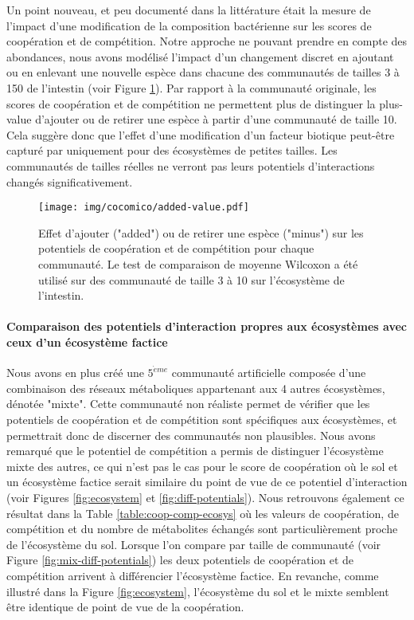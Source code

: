 \documentclass[../main.tex]{subfiles}
\begin{document}
Un point nouveau, et peu documenté dans la littérature était la mesure de l'impact d'une modification de la composition bactérienne sur les scores de coopération et de compétition. Notre approche ne pouvant prendre en compte des abondances, nous avons modélisé l'impact d'un changement discret en ajoutant ou en enlevant une nouvelle espèce dans chacune des communautés de tailles 3 à 150 de l'intestin (voir Figure \ref{fig:added-value}). Par rapport à la communauté originale, les scores de coopération et de compétition ne permettent plus de distinguer la plus-value d'ajouter ou de retirer une espèce à partir d'une communauté de taille 10. Cela suggère donc que l'effet d'une modification d'un facteur biotique peut-être capturé par \ccmc uniquement pour des écosystèmes de petites tailles. Les communautés de tailles réelles ne verront pas leurs potentiels d'interactions changés significativement.


\begin{figure}[H]
    \centering
    \texttt{[image: img/cocomico/added-value.pdf]}
    \caption{Effet d'ajouter ("added") ou de retirer une espèce ("minus") sur les potentiels de coopération et de compétition pour chaque communauté. Le test de comparaison de moyenne Wilcoxon a été utilisé sur des communauté de taille 3 à 10 sur l'écosystème de l'intestin.}
    \label{fig:added-value}
\end{figure}

\paragraph*{Comparaison des potentiels d'interaction propres aux écosystèmes avec ceux d'un écosystème factice}

Nous avons en plus créé une $5^{\grave{e}me}$ communauté artificielle composée d'une combinaison des réseaux métaboliques appartenant aux 4 autres écosystèmes, dénotée "mixte". Cette communauté non réaliste permet de vérifier que les potentiels de coopération et de compétition sont spécifiques aux écosystèmes, et permettrait donc de discerner des communautés non plausibles. Nous avons remarqué que le potentiel de compétition a permis de distinguer l'écosystème mixte des autres, ce qui n'est pas le cas pour le score de coopération où le sol et un écosystème factice serait similaire du point de vue de ce potentiel d'interaction (voir Figures \ref{fig:ecosystem} et \ref{fig:diff-potentials}). Nous retrouvons également ce résultat dans la Table \ref{table:coop-comp-ecosys} où les valeurs de coopération, de compétition et du nombre de métabolites échangés sont particulièrement proche de l'écosystème du sol.  Lorsque l'on compare par taille de communauté (voir Figure \ref{fig:mix-diff-potentials}) les deux potentiels de coopération et de compétition arrivent à différencier l'écosystème factice. En revanche, comme illustré dans la Figure \ref{fig:ecosystem}, l'écosystème du sol et le mixte semblent être identique de point de vue de la coopération.
\end{document}

